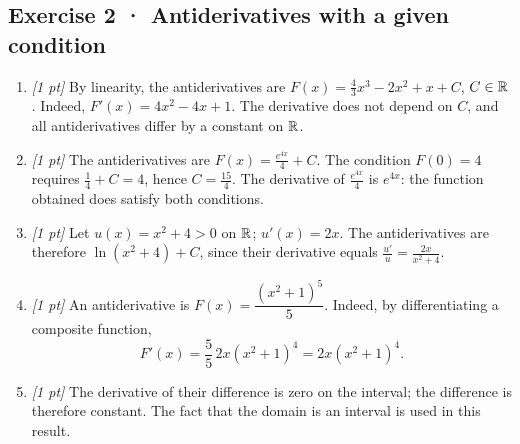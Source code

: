 \subsection*{Exercise 2 · Antiderivatives with a given condition}\begin{enumerate}

\item \textit{[1 pt]} By linearity, the antiderivatives are $F(x)=\frac{4}{3}x^3-2x^2+x+C$, $C\in\mathbb R$. Indeed, $F'(x)=4x^2-4x+1$. The derivative does not depend on $C$, and all antiderivatives differ by a constant on $\mathbb R$.

\item \textit{[1 pt]} The antiderivatives are $F(x)=\frac{e^{4x}}{4}+C$. The condition $F(0)=4$ requires $\frac{1}{4}+C=4$, hence $C=\frac{15}{4}$. The derivative of $\frac{e^{4x}}{4}$ is $e^{4x}$: the function obtained does satisfy both conditions.

\item \textit{[1 pt]} Let $u(x)=x^2+4>0$ on $\mathbb R$; $u'(x)=2x$. The antiderivatives are therefore $\ln(x^2+4)+C$, since their derivative equals $\frac{u'}{u}=\frac{2x}{x^2+4}$.

\item \textit{[1 pt]} An antiderivative is $F(x)=\dfrac{(x^2+1)^{5}}{5}$. Indeed, by differentiating a composite function,
\[F'(x)=\frac{5}{5}\,2x(x^2+1)^{4}=2x(x^2+1)^{4}.\]

\item \textit{[1 pt]} The derivative of their difference is zero on the interval; the difference is therefore constant. The fact that the domain is an interval is used in this result.

\end{enumerate}

